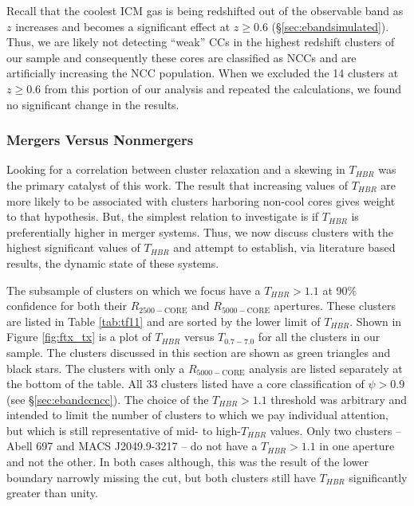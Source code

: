 Recall that the coolest ICM gas is being redshifted out of the
observable band as $z$ increases and becomes a significant effect at
$z \geq 0.6$ (\S\ref{sec:ebandsimulated}). Thus, we are likely not detecting
``weak'' CCs in the highest redshift clusters of our sample and
consequently these cores are classified as NCCs and are artificially
increasing the NCC population. When we excluded the 14 clusters at $z
\geq 0.6$ from this portion of our analysis and repeated the
calculations, we found no significant change in the results.

\subsubsection{Mergers Versus Nonmergers}
\label{sec:ebandmerge}

Looking for a correlation between cluster relaxation and a skewing in
$T_{HBR}$ was the primary catalyst of this work. The result that
increasing values of $T_{HBR}$ are more likely to be associated with
clusters harboring non-cool cores gives weight to that
hypothesis. But, the simplest relation to investigate is if $T_{HBR}$
is preferentially higher in merger systems. Thus, we now discuss
clusters with the highest significant values of $T_{HBR}$ and attempt
to establish, via literature based results, the dynamic state of these
systems.

The subsample of clusters on which we focus have a $T_{HBR} > 1.1$ at
90\% confidence for both their $R_{2500-\mathrm{CORE}}$ and
$R_{5000-\mathrm{CORE}}$ apertures. These clusters are listed in Table
\ref{tab:tf11} and are sorted by the lower limit of $T_{HBR}$. Shown
in Figure \ref{fig:ftx_tx} is a plot of $T_{HBR}$ versus $T_{0.7-7.0}$
for all the clusters in our sample. The clusters discussed in this
section are shown as green triangles and black stars. The clusters
with only a $R_{5000-\mathrm{CORE}}$ analysis are listed separately at
the bottom of the table. All 33 clusters listed have a core
classification of $\psi > 0.9$ (see \S\ref{sec:ebandccncc}). The choice of
the $T_{HBR} > 1.1$ threshold was arbitrary and intended to limit the
number of clusters to which we pay individual attention, but which is
still representative of mid- to high-$T_{HBR}$ values. Only two
clusters -- Abell 697 and MACS J2049.9-3217 -- do not have a $T_{HBR}
> 1.1$ in one aperture and not the other. In both cases although, this
was the result of the lower boundary narrowly missing the cut, but
both clusters still have $T_{HBR}$ significantly greater than unity.

